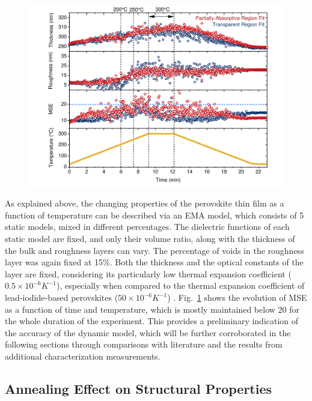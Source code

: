 \begin{figure}[htbp]
  \centering
  \medskip
  \includegraphics[width=.99\textwidth]{chapters/ellipsometry/image/Roughness_Thickness.pdf}
  \caption{}
  \label{fig:ellipsometry:roughness_thickness}
\end{figure}


As explained above, the changing properties of the perovskite thin film as a function of temperature can be described via an EMA model, which consists of 5 static models, mixed in different percentages. The dielectric functions of each static model are fixed, and only their volume ratio, along with the thickness of the bulk and roughness layers can vary. The percentage of voids in the roughness layer was again fixed at 15\%. Both the thickness and the optical constants of the  layer are fixed, considering its particularly low thermal expansion coefficient ($0.5 \times 10^{-6} K^{-1}$), especially when compared to the thermal expansion coefficient of lead-iodide-based perovskites ($50\times10^{-6} K^{-1}$) \cite{Steele2019ThermalFilms}. Fig.~\ref{fig:ellipsometry:roughness_thickness} shows the evolution of MSE as a function of time and temperature, which is mostly maintained below 20 for the whole duration of the experiment. This provides a preliminary indication of the accuracy of the dynamic model, which will be further corroborated in the following sections through comparisons with literature and the results from additional characterization measurements. 

\subsection{Annealing Effect on Structural Properties}

